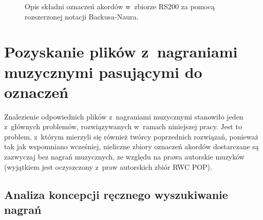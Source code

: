 \begin{figure}[tb]
    \centering
    {\scriptsize }
    \caption{Opis składni oznaczeń akordów w~zbiorze RS200 za pomocą rozszerzonej notacji Backusa-Naura.}
    \label{fig:rs200_dt_syntax}
\end{figure}


\section{Pozyskanie plików z~nagraniami muzycznymi pasującymi do oznaczeń}

Znalezienie odpowiednich plików z~nagraniami muzycznymi stanowiło jeden z~głównych problemów, rozwiązywanych w~ramach niniejszej pracy. Jest to problem, z~którym mierzyli się również twórcy poprzednich rozwiązań, ponieważ tak jak wspomniano wcześniej, nieliczne zbiory oznaczeń akordów dostarczane są zazwyczaj bez nagrań muzycznych, ze względu na prawa autorskie muzyków (wyjątkiem jest oczyszczony z~praw autorskich zbiór RWC POP).

\subsection{Analiza koncepcji ręcznego wyszukiwanie nagrań}

